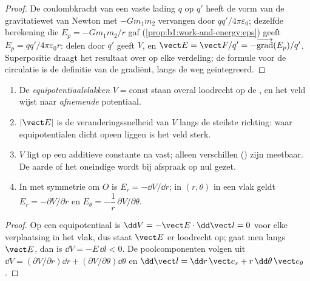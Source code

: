 \begin{proof}
De coulombkracht van een vaste lading $q$ op $q'$ heeft de vorm van de
gravitatiewet van Newton met $-Gm_1m_2$ vervangen door $qq'/4\pi\varepsilon_0$; dezelfde
berekening die $E_p = -Gm_1m_2/r$ gaf
(\cref{prop:b1:work-and-energy:eps}) geeft $E_p = qq'/4\pi\varepsilon_0r$:
delen door $q'$ geeft $V$, en $\vect E = \vect F/q' =
-\overrightarrow{\operatorname{grad}}(E_p)/q'$. Superpositie draagt het
resultaat over op elke verdeling; de formule voor de circulatie is de definitie
van de gradiënt, langs de weg geïntegreerd.
\end{proof}

\begin{proposition}\label{prop:b1:potential-capacitors:reading}
\begin{enumerate}
  \item De \emph{equipotentiaalvlakken} $V = \text{const}$ staan overal
        loodrecht op de , en het veld wijst naar
        \emph{afnemende} potentiaal.
  \item $|\vect E|$ is de veranderingssnelheid van $V$ langs de steilste
        richting: waar equipotentialen dicht opeen liggen is het veld sterk.
  \item $V$ ligt op een additieve constante na vast; alleen verschillen
        () zijn meetbaar. De aarde of het oneindige wordt bij afspraak
        op nul gezet.
  \item In  met symmetrie om $O$ is $E_r = -\dd V/
        \dd r$; in  $(r, \theta)$ in een vlak geldt
        $E_r = -\partial V/\partial r$ en $E_\theta = -\dfrac1r\,\partial V/\partial\theta$.
\end{enumerate}
\end{proposition}

\begin{proof}
Op een equipotentiaal is $\dd V = -\vect E\cdot\dd\vect l = 0$ voor elke
verplaatsing in het vlak, dus staat $\vect E$ er loodrecht op; gaat men langs
$\vect E$, dan is $\dd V = -E\,\dd l < 0$. De poolcomponenten volgen uit
$\dd V = (\partial V/\partial r)\dd r + (\partial V/\partial\theta)\dd\theta$ en
$\dd\vect l = \dd r\,\vect e_r + r\,\dd\theta\,\vect e_\theta$.
\end{proof}

